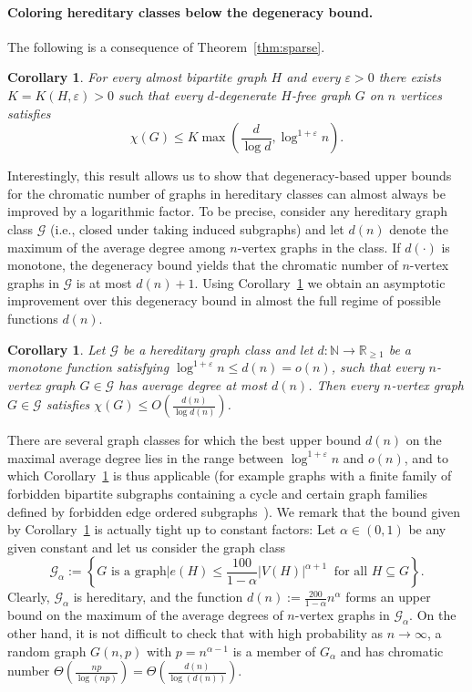 \documentclass[10pt]{amsart}
\newtheorem{corollary}[theorem]{Corollary}
\theoremstyle{definition}
\begin{document}
\paragraph*{\textbf{Coloring hereditary classes below the degeneracy bound.}} 
The following is a consequence of Theorem~\ref{thm:sparse}.
\begin{corollary}\label{cor:logbound}
For every almost bipartite graph $H$ and every $\varepsilon>0$ there exists $K=K(H,\varepsilon)>0$ such that every $d$-degenerate $H$-free graph $G$ on $n$ vertices satisfies $$\chi(G) \le K \max\left(\frac{d}{\log d},\log^{1+\varepsilon} n\right).$$
\end{corollary}
Interestingly, this result allows us to show that degeneracy-based upper bounds for the chromatic number of graphs in hereditary classes can almost always be improved by a logarithmic factor. To be precise, consider any hereditary graph class $\mathcal{G}$ (i.e., closed under taking induced subgraphs) and let $d(n)$ denote the maximum of the average degree among $n$-vertex graphs in the class. If $d(\cdot)$ is monotone, the degeneracy bound yields that the chromatic number of $n$-vertex graphs in $\mathcal{G}$ is at most $d(n)+1$. Using Corollary~\ref{cor:logbound} we obtain an asymptotic improvement over this degeneracy bound in almost the full regime of possible functions $d(n)$.
\begin{corollary}\label{cor:hereditary}
    Let $\mathcal{G}$ be a hereditary graph class and let $d:\mathbb{N}\rightarrow \mathbb{R}_{\ge 1}$ be a monotone function satisfying $\log^{1+\varepsilon} n\le d(n)=o(n)$, such that every $n$-vertex graph $G\in \mathcal{G}$ has average degree at most $d(n)$. Then every $n$-vertex graph $G\in \mathcal{G}$ satisfies $\chi(G)\le O\left(\frac{d(n)}{\log d(n)}\right)$.
\end{corollary}
There are several graph classes for which the best upper bound $d(n)$ on the maximal average degree lies in the range between $\log^{1+\varepsilon} n$ and $o(n)$, and to which Corollary~\ref{cor:hereditary} is thus applicable (for example graphs with a finite family of forbidden bipartite subgraphs containing a cycle and certain graph families defined by forbidden edge ordered subgraphs~\cite{gerbner,janzer}).
We remark that the bound given by Corollary~\ref{cor:hereditary} is actually tight up to constant factors: Let $\alpha\in (0,1)$ be any given constant and let us consider the graph class $$\mathcal{G}_\alpha:=\left\{G \text{ is a graph}\bigg\vert e(H)\le \frac{100}{1-\alpha}|V(H)|^{\alpha+1}\ \text{ for all }H\subseteq G\right\}.$$ Clearly, $\mathcal{G}_\alpha$ is hereditary, and the function $d(n):=\frac{200}{1-\alpha} n^\alpha$ forms an upper bound on the maximum of the average degrees of $n$-vertex graphs in $\mathcal{G}_\alpha$. On the other hand, it is not difficult to check that with high probability as $n\rightarrow \infty$, a random graph $G(n,p)$ with $p=n^{\alpha-1}$ is a member of $G_\alpha$ and has chromatic number $\Theta\left(\frac{np}{\log(np)}\right)=\Theta\left(\frac{d(n)}{\log(d(n))}\right)$.
\end{document}
